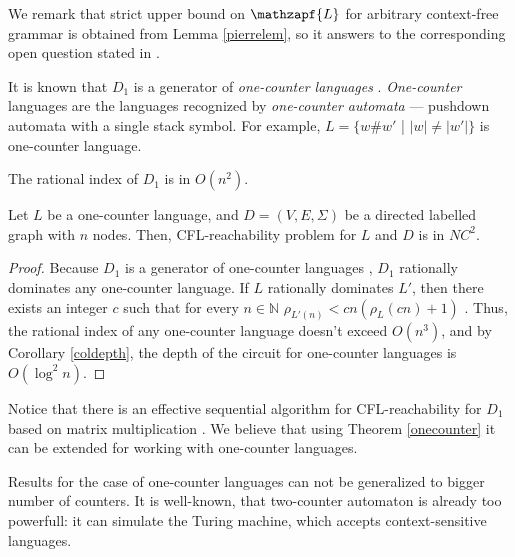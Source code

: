 We remark that strict upper bound on $\mathzapf{L}$ for arbitrary context-free grammar is obtained from Lemma \ref{pierrelem}, so it answers to the corresponding open question stated in \cite{HellingsCFPQ}.


It is known that $D_1$ is a generator of \textit{one-counter languages} \cite{GreibHier}. \textit{One-counter} languages are the languages recognized by \textit{one-counter automata} --- pushdown automata with a single stack symbol. For example, $L = \{w\#w'$ | $|w| \neq |w'|\}$ is one-counter language.



\begin{lemma}
\label{dyck1lem}
The rational index of $D_1$ is in $O(n^2)$.
\end{lemma}
\begin{theorem}
\label{onecounter}
Let $L$ be a one-counter language, and $D=(V, E, \Sigma)$ be a directed labelled graph with $n$ nodes. Then, CFL-reachability problem for $L$ and $D$ is in $NC^2$.
\end{theorem}
\begin{proof} 
Because $D_1$ is a generator of one-counter languages \cite{GreibHier}, $D_1$ rationally dominates any one-counter language. If $L$ rationally dominates $L'$, then there exists an integer $c$ such that for every $n \in \mathbb{N}$ $\rho_{L'(n)} < cn(\rho_L(cn) + 1)$ \cite{RatBasic}.  Thus, the rational index of any one-counter language doesn't exceed $O(n^3)$, and by Corollary \ref{coldepth}, the depth of the circuit for one-counter languages is $O(\log^2 n)$.
\end{proof}

Notice that there is an effective sequential algorithm for CFL-reachability for $D_1$ based on matrix multiplication \cite{Bradford}. We believe that using Theorem \ref{onecounter} it can be extended for working with one-counter languages.


Results for the case of one-counter languages can not be generalized to bigger number of counters. It is well-known, that two-counter automaton is already too powerfull: it can simulate the Turing machine, which accepts context-sensitive languages. 


